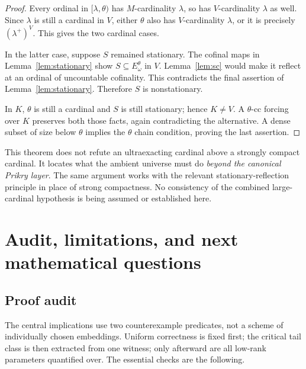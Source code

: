 \documentclass[11pt,letterpaper]{article}
\theoremstyle{definition}
\numberwithin{equation}{section}
\begin{document}
\begin{proof}
Every ordinal in $[\lambda,\theta)$ has $M$-cardinality $\lambda$,
so has $V$-cardinality $\lambda$ as well. Since $\lambda$ is still a
cardinal in $V$, either $\theta$ also has $V$-cardinality $\lambda$,
or it is precisely $(\lambda^+)^V$. This gives the two cardinal cases.

In the latter case, suppose $S$ remained stationary. The cofinal maps
in Lemma~\ref{lem:stationary} show $S\subseteq E_\omega^\theta$ in $V$.
Lemma~\ref{lem:sc} would make it reflect at an ordinal of uncountable
cofinality. This contradicts the final assertion of
Lemma~\ref{lem:stationary}. Therefore $S$ is nonstationary.

In $K$, $\theta$ is still a cardinal and $S$ is still stationary;
hence $K\ne V$. A $\theta$-cc forcing over $K$ preserves both those
facts, again contradicting the alternative. A dense subset of size
below $\theta$ implies the $\theta$ chain condition, proving the
last assertion.
\end{proof}

This theorem does not refute an ultraexacting cardinal above a
strongly compact cardinal. It locates what the ambient universe must
do \emph{beyond the canonical Prikry layer}. The same argument works
with the relevant stationary-reflection principle in place of strong
compactness. No consistency of the combined large-cardinal hypothesis
is being assumed or established here.

\section{Audit, limitations, and next mathematical questions}\label{sec:audit}

\subsection{Proof audit}

The central implications use two counterexample predicates, not a
scheme of individually chosen embeddings. Uniform correctness is
fixed first; the critical tail class is then extracted from one
witness; only afterward are all low-rank parameters quantified over.
The essential checks are the following.
\end{document}
